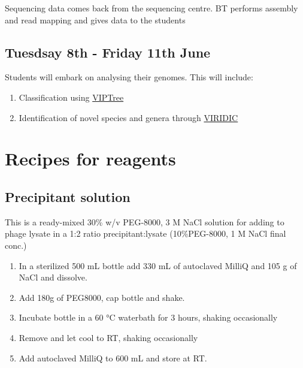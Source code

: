 \documentclass[
]{book}
\providecommand{\tightlist}{%
  \setlength{\itemsep}{0pt}\setlength{\parskip}{0pt}}
\begin{document}
Sequencing data comes back from the sequencing centre. BT performs assembly and read mapping and gives data to the students

\hypertarget{tuesdsay-8th---friday-11th-june}{%
\section{Tuesdsay 8th - Friday 11th June}\label{tuesdsay-8th---friday-11th-june}}

Students will embark on analysing their genomes. This will include:

\begin{enumerate}
\def\labelenumi{\arabic{enumi}.}
\tightlist
\item
  Classification using \href{https://www.genome.jp/viptree/}{VIPTree}
\item
  Identification of novel species and genera through \href{http://rhea.icbm.uni-oldenburg.de/VIRIDIC/}{VIRIDIC}
\end{enumerate}

\hypertarget{recipes-for-reagents}{%
\chapter*{Recipes for reagents}\label{recipes-for-reagents}}

\hypertarget{precipitant-solution}{%
\section{Precipitant solution}\label{precipitant-solution}}

This is a ready-mixed 30\% w/v PEG-8000, 3 M NaCl solution for adding to phage lysate in a 1:2 ratio precipitant:lysate (10\%PEG-8000, 1 M NaCl final conc.)

\begin{enumerate}
\def\labelenumi{\arabic{enumi}.}
\tightlist
\item
  In a sterilized 500 mL bottle add 330 mL of autoclaved MilliQ and 105 g of NaCl and dissolve.
\item
  Add 180g of PEG8000, cap bottle and shake.
\item
  Incubate bottle in a 60 °C waterbath for 3 hours, shaking occasionally
\item
  Remove and let cool to RT, shaking occasionally
\item
  Add autoclaved MilliQ to 600 mL and store at RT.
\end{enumerate}
\end{document}
